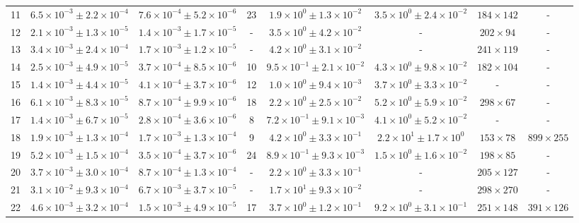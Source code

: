 \begin{table}
\begin{tabular}{cccccccc}
11 & $6.5\times10^{-3}\pm 2.2\times10^{-4}$ & $7.6\times10^{-4}\pm 5.2\times10^{-6}$ & 23 & $1.9\times10^{0}\pm 1.3\times10^{-2}$ & $3.5\times10^{0}\pm 2.4\times10^{-2}$ & $184\times 142$ & - \\
12 & $2.1\times10^{-3}\pm 1.3\times10^{-5}$ & $1.4\times10^{-3}\pm 1.7\times10^{-5}$ & - & $3.5\times10^{0}\pm 4.2\times10^{-2}$ & - & $202\times 94$ & - \\
13 & $3.4\times10^{-3}\pm 2.4\times10^{-4}$ & $1.7\times10^{-3}\pm 1.2\times10^{-5}$ & - & $4.2\times10^{0}\pm 3.1\times10^{-2}$ & - & $241\times 119$ & - \\
14 & $2.5\times10^{-3}\pm 4.9\times10^{-5}$ & $3.7\times10^{-4}\pm 8.5\times10^{-6}$ & 10 & $9.5\times10^{-1}\pm 2.1\times10^{-2}$ & $4.3\times10^{0}\pm 9.8\times10^{-2}$ & $182\times 104$ & - \\
15 & $1.4\times10^{-3}\pm 4.4\times10^{-5}$ & $4.1\times10^{-4}\pm 3.7\times10^{-6}$ & 12 & $1.0\times10^{0}\pm 9.4\times10^{-3}$ & $3.7\times10^{0}\pm 3.3\times10^{-2}$ & - & - \\
16 & $6.1\times10^{-3}\pm 8.3\times10^{-5}$ & $8.7\times10^{-4}\pm 9.9\times10^{-6}$ & 18 & $2.2\times10^{0}\pm 2.5\times10^{-2}$ & $5.2\times10^{0}\pm 5.9\times10^{-2}$ & $298\times 67$ & - \\
17 & $1.4\times10^{-3}\pm 6.7\times10^{-5}$ & $2.8\times10^{-4}\pm 3.6\times10^{-6}$ & 8 & $7.2\times10^{-1}\pm 9.1\times10^{-3}$ & $4.1\times10^{0}\pm 5.2\times10^{-2}$ & - & - \\
18 & $1.9\times10^{-3}\pm 1.3\times10^{-4}$ & $1.7\times10^{-3}\pm 1.3\times10^{-4}$ & 9 & $4.2\times10^{0}\pm 3.3\times10^{-1}$ & $2.2\times10^{1}\pm 1.7\times10^{0}$ & $153\times 78$ & $899\times 255$ \\
19 & $5.2\times10^{-3}\pm 1.5\times10^{-4}$ & $3.5\times10^{-4}\pm 3.7\times10^{-6}$ & 24 & $8.9\times10^{-1}\pm 9.3\times10^{-3}$ & $1.5\times10^{0}\pm 1.6\times10^{-2}$ & $198\times 85$ & - \\
20 & $3.7\times10^{-3}\pm 3.0\times10^{-4}$ & $8.7\times10^{-4}\pm 1.3\times10^{-4}$ & - & $2.2\times10^{0}\pm 3.3\times10^{-1}$ & - & $205\times 127$ & - \\
21 & $3.1\times10^{-2}\pm 9.3\times10^{-4}$ & $6.7\times10^{-3}\pm 3.7\times10^{-5}$ & - & $1.7\times10^{1}\pm 9.3\times10^{-2}$ & - & $298\times 270$ & - \\
22 & $4.6\times10^{-3}\pm 3.2\times10^{-4}$ & $1.5\times10^{-3}\pm 4.9\times10^{-5}$ & 17 & $3.7\times10^{0}\pm 1.2\times10^{-1}$ & $9.2\times10^{0}\pm 3.1\times10^{-1}$ & $251\times 148$ & $391\times 126$ \\

\end{tabular}
\end{table}
